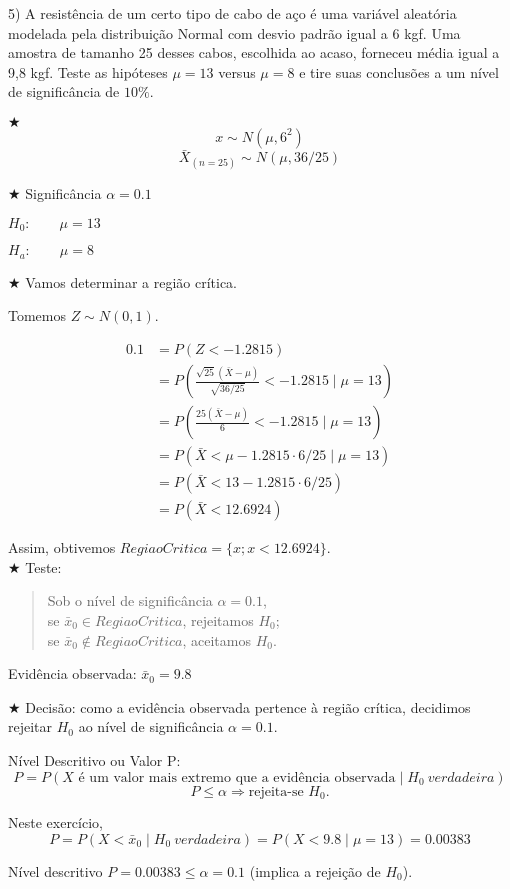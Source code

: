 \documentclass[12pt,a4paper]{article}
\begin{document}
5) A resistência de um certo tipo de cabo de aço é uma variável aleatória modelada pela distribuição Normal com desvio padrão igual a 6 kgf. Uma amostra de tamanho 25 desses cabos, escolhida ao acaso, forneceu média igual a 9,8 kgf. Teste as hipóteses $\mu = 13$ versus $\mu = 8$ e tire suas conclusões a um nível de significância de $10\%$.



\dotfill

$\bigstar$ 
\[
x \sim N(\mu,6^2)
\]
\[
\bar X_{(n=25)} \sim N(\mu, 36/25)
\]

$\bigstar$ Significância $\alpha=0.1$

\qquad$H_0: \qquad \mu=13$

\qquad$H_a: \qquad \mu=8$

$\bigstar$ Vamos determinar a região crítica.

Tomemos $Z\sim N(0,1)$.

\[\begin{aligned}
0.1&=P(Z<-1.2815) \\
&= P\left(\frac{\sqrt{25}(\bar X - \mu)}{\sqrt{36/25}} <-1.2815\;\Big|\;\mu=13\right) 
\\
&= P\left(\frac{25(\bar X - \mu)}{6} < -1.2815\;\Big|\;\mu=13\right)
\\
&= P(\bar X <\mu-1.2815\cdot 6/25\;|\;\mu=13)
\\
&= P(\bar X <13-1.2815\cdot 6/25)
\\
&= P(\bar X<12.6924)
\end{aligned}\]

Assim, obtivemos $RegiaoCritica=\{x; x<12.6924\}$.\\

$\bigstar$ Teste: 
\begin{quote}
Sob o nível de significância $\alpha=0.1$,\\
se $\bar x_0 \in RegiaoCritica$, rejeitamos $H_0$;\\
se $\bar x_0\not \in RegiaoCritica$, aceitamos $H_0$.
\end{quote}

Evidência observada: $\bar x_0=9.8$

$\bigstar$ Decisão: como a evidência observada pertence à região crítica, decidimos rejeitar $H_0$ ao nível de significância $\alpha=0.1$.


Nível Descritivo ou Valor P:
\[
P=P(X\text{ é um valor mais extremo que a evidência observada}\;|\;H_0\ verdadeira)
\]
\[
P\le\alpha \Rightarrow \mbox{rejeita-se $H_0$}.
\]

Neste exercício,
\[
P=P(X< \bar x_0\;|\;H_0\ verdadeira)=P(X< 9.8\;|\;\mu=13)=0.00383
\]

Nível descritivo $P=0.00383\le \alpha=0.1$ (implica a rejeição de $H_0$).
\end{document}
